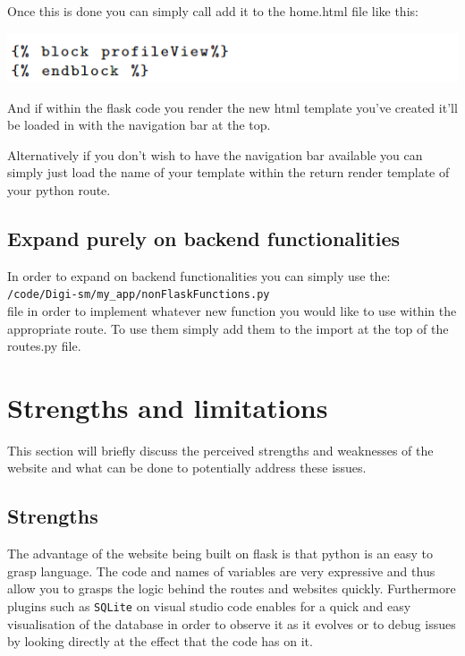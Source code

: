 \documentclass{article}
\begin{document}
Once this is done you can simply call add it to the home.html file like this:

\begin{center}
    \includegraphics[scale=1]{htmlBlock.png} 
\end{center}
And if within the flask code you render the new html template you've created it'll be loaded in 
with the navigation bar at the top.

Alternatively if you don't wish to have the navigation bar available you can simply just load the name of your template within the return render template of your python route.


\subsection{Expand purely on backend functionalities}
In order to expand on backend functionalities you can simply use the:\\
\verb|/code/Digi-sm/my_app/nonFlaskFunctions.py|\\
file in order to implement whatever new function you would like to use within the appropriate route. To use them simply add them to the import at the top of the routes.py file.

\section{Strengths and limitations}
This section will briefly discuss the perceived strengths and weaknesses of the website and what can be done to potentially address these issues.

\subsection{Strengths}
The advantage of the website being built on flask is that python is an easy to grasp language. The code and names of variables are very expressive and thus allow you to grasps the logic behind the routes and websites quickly. 
Furthermore plugins such as \verb|SQLite| on visual studio code enables for a quick and easy visualisation of the database in order to observe it as it evolves or to debug issues by looking directly at the effect that the code has on it.

\newpage
\end{document}
